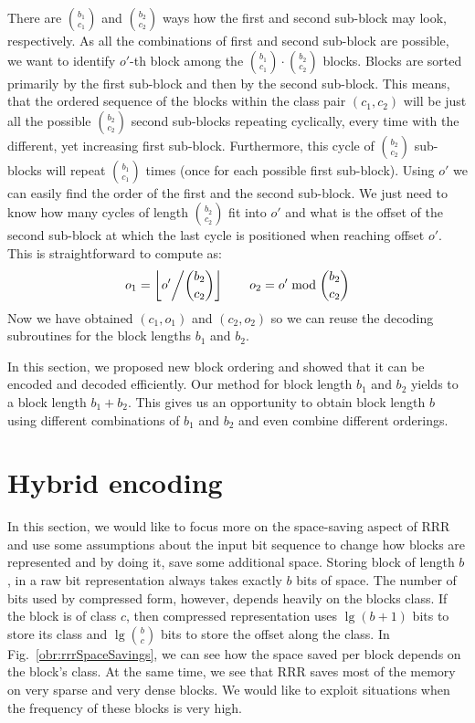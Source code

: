 There are ${b_1 \choose c_1}$ and ${b_2 \choose c_2}$ ways how the first and second
sub-block may look, respectively. As all the combinations of first and second sub-block are
possible, we want to identify $o'$-th block among the ${b_1 \choose c_1}\cdot {b_2 \choose c_2}$
blocks. Blocks are sorted primarily by the first sub-block and then by the second sub-block.
This means, that the ordered sequence of the blocks within the class pair $(c_1, c_2)$ will be
just all the possible ${b_2 \choose c_2}$ second sub-blocks repeating cyclically, every time
with the different, yet increasing first sub-block. Furthermore, this cycle of
${b_2 \choose c_2}$ sub-blocks will repeat ${b_1 \choose c_1}$ times (once for each possible
first sub-block). Using $o'$ we can easily find the order of the first and the second sub-block.
We just need to know how many cycles of length ${b_2 \choose c_2}$ fit into $o'$ and what is
the offset of the second sub-block at which the last cycle is positioned when reaching 
offset $o'$. This is straightforward to compute as:
$$o_1 = \left\lfloor o' \middle/{b_2 \choose c_2} \right\rfloor\qquad o_2 = o'\bmod {b_2 \choose c_2}$$
Now we have obtained $(c_1, o_1)$ and $(c_2, o_2)$ so we can reuse the decoding subroutines for the
block lengths $b_1$ and $b_2$.

In this section, we proposed new block ordering and showed that it can be encoded and decoded
efficiently. Our method for block length $b_1$ and $b_2$ yields to a block length $b_1+b_2$.
This gives us an opportunity to obtain block length $b$ using different combinations of $b_1$
and $b_2$ and even combine different orderings.

\section{Hybrid encoding}

In this section, we would like to focus more on the space-saving aspect of RRR and use some
assumptions about the input bit sequence to change how blocks are represented and by doing
it, save some additional space. Storing block of length $b$, in a raw bit representation
always takes exactly $b$ bits of space. The number of bits used by compressed form, however,
depends heavily on the blocks class. If the block is of class $c$, then compressed
representation uses $\lg (b+1)$ bits to store its class and $\lg {b\choose c}$
bits to store the offset along the class. In Fig.~\ref{obr:rrrSpaceSavings}, we can see
how the space saved per block depends on the block’s class. At the same time, we see
that RRR saves most of the memory on very sparse and very dense blocks. We would like
to exploit situations when the frequency of these blocks is very high.

